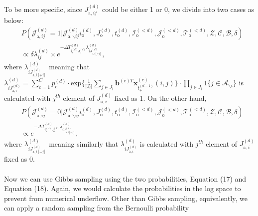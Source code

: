 \documentclass[a4paper]{article}
\begin{document}
To be more specific, since ${J}^{(d)}_{\mbox{a}, ij}$ could be either 1 or 0, we divide into two cases as below:
      \begin{equation}
      \begin{aligned}
      &P(\mathcal{J}^{(d)}_{\mbox{a}, ij}=1| \mathcal{J}^{(d)}_{\mbox{a}, \backslash ij}  i^{(d)}_{\mbox{o}}, J^{(d)}_{\mbox{o}}, t^{(d)}_{\mbox{o}}, \mathcal{I}^{(<d)}_{\mbox{o}}, \mathcal{J}^{(<d)}_{\mbox{o}}, \mathcal{T}^{(<d)}_{\mbox{o}}, \mathcal{Z}, \mathcal{C}, \mathcal{B}, \delta)\\& \propto \delta\lambda^{(d)}_{ij}\times e^{-\Delta T^{(d)}_{i_o^{(d)}J_o^{(d)}}\lambda^{(d)}_{iJ^{(d)}_{\mbox{a}, i[+j]}}},
      \end{aligned}
      \end{equation}
      where $\lambda^{(d)}_{iJ^{(d)}_{\mbox{a}, i[+j]}}$ meaning that $\lambda^{(d)}_{iJ^{(d)}_{\mbox{a}, i}}=\sum\limits_{c=1}^{C} p^{(d)}_c\cdot\mbox{exp}\Big\{\frac{1}{|J_i|}\sum\limits_{j \in{J_i}}\boldsymbol{b}^{(c)T}\boldsymbol{x}^{(c)}_{t^{(d-1)}_+}(i, j)\Big\}\cdot \prod\limits_{j \in J_i}1\{j \in \mathcal{A}_{\backslash i}\}$ is calculated with $j^{th}$ element of $J_{\mbox{a}, i}^{(d)}$ fixed as 1. On the other hand, 
     \begin{equation}
     \begin{aligned}
     &P(\mathcal{J}^{(d)}_{\mbox{a}, ij}=0| \mathcal{J}^{(d)}_{\mbox{a}, \backslash ij}  i^{(d)}_{\mbox{o}}, J^{(d)}_{\mbox{o}}, t^{(d)}_{\mbox{o}}, \mathcal{I}^{(<d)}_{\mbox{o}}, \mathcal{J}^{(<d)}_{\mbox{o}}, \mathcal{T}^{(<d)}_{\mbox{o}}, \mathcal{Z}, \mathcal{C}, \mathcal{B}, \delta)\\& \propto e^{-\Delta T^{(d)}_{i_o^{(d)}J_o^{(d)}}\lambda^{(d)}_{iJ^{(d)}_{\mbox{a}, i[-j]}}},
     \end{aligned}
     \end{equation}
       where $\lambda^{(d)}_{iJ^{(d)}_{\mbox{a}, i[-j]}}$ meaning similarly that $\lambda^{(d)}_{iJ^{(d)}_{\mbox{a}, i}}$ is calculated with $j^{th}$ element of $J_{\mbox{a}, i}^{(d)}$ fixed as 0. \\\\ \newline Now we can use Gibbs sampling using the two probabilities, Equation (17) and Equation (18). Again, we would calculate the probabilities in the log space to prevent from numerical underflow. Other than Gibbs sampling, equivalently, we can apply a random sampling from the Bernoulli probability
\end{document}
